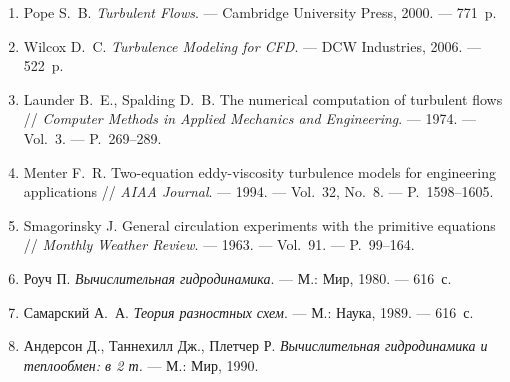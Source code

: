 \documentclass[14pt,a4paper,extarticle]{extarticle}
\begin{document}
\begin{enumerate}
  \item Pope S.~B.
  \emph{Turbulent Flows}.
  --- Cambridge University Press, 2000. --- 771~p.
  \item Wilcox D.~C.
  \emph{Turbulence Modeling for CFD}.
  --- DCW Industries, 2006. --- 522~p.
  \item Launder B.~E., Spalding D.~B.
  The numerical computation of turbulent flows //
  \emph{Computer Methods in Applied Mechanics and Engineering}. ---
  1974. --- Vol.~3. --- P.~269--289.
  \item Menter F.~R.
  Two-equation eddy-viscosity turbulence models for engineering applications //
  \emph{AIAA Journal}. --- 1994. --- Vol.~32, No.~8. --- P.~1598--1605.
  \item Smagorinsky J.
  General circulation experiments with the primitive equations //
  \emph{Monthly Weather Review}. --- 1963. --- Vol.~91. --- P.~99--164.
  \item Роуч П.
  \emph{Вычислительная гидродинамика}.
  --- М.: Мир, 1980. --- 616~с.
  \item Самарский А.~А.
  \emph{Теория разностных схем}.
  --- М.: Наука, 1989. --- 616~с.
  \item Андерсон Д., Таннехилл Дж., Плетчер Р.
  \emph{Вычислительная гидродинамика и теплообмен: в 2 т.}
  --- М.: Мир, 1990.
\end{enumerate}
\end{document}
